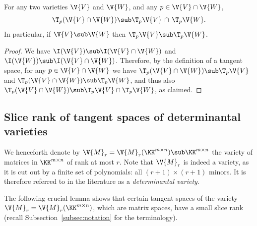 \begin{proposition}\label{prop:tangent-cap}
	For any two varieties $\V{V}$ and $\V{W}$, and any $p \in \V{V} \cap \V{W}$, 
	$$\T_p (\V{V} \cap \V{W}) \sub \T_p\V{V} \,\cap\, \T_p\V{W}.$$
	In particular, if $\V{V} \sub \V{W}$ then $\T_p \V{V} \sub \T_p \V{W}$.
\end{proposition}
\begin{proof}
	We have $\I(\V{V}) \sub \I(\V{V}\cap \V{W})$ and $\I(\V{W}) \sub \I(\V{V}\cap \V{W})$. Therefore, by the definition of a tangent space, for any $p \in \V{V}\cap\V{W}$ we have $\T_p(\V{V}\cap\V{W}) \sub \T_p\V{V}$ and $\T_p(\V{V}\cap\V{W}) \sub \T_p\V{W}$,
	and thus also $\T_p(\V{V}\cap\V{W}) \sub  \T_p\V{V} \cap  \T_p\V{W}$, as claimed.
\end{proof}

\subsection{Slice rank of tangent spaces of determinantal varieties}

We henceforth denote by $\V{M}_r = \V{M}_r(\KK^{m\times n}) \sub \KK^{m \times n}$ the variety of matrices in $\KK^{m\times n}$ of rank at most $r$.
Note that $\V{M}_r$ is indeed a variety, as it is cut out by a finite set of polynomials: all $(r+1)\times(r+1)$ minors.
It is therefore referred to in the literature as a \emph{determinantal variety}.

The following crucial lemma shows that certain tangent spaces of the variety $\V{M}_r=\V{M}_{r}(\KK^{m \times n})$,
which are matrix spaces, 
have a small slice rank (recall Subsection~\ref{subsec:notation} for the terminology).

